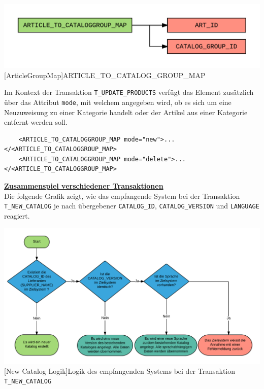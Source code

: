 	\begin{minipage}{\linewidth}
		\vspace{1em}
		\centering
		\includegraphics[width=0.7\linewidth]{img/articleGroupMap}
		[ArticleGroupMap]{ARTICLE\_TO\_CATALOG\_GROUP\_MAP}
		\label{fig:header}
		\vspace{1em}
	\end{minipage}
	
	Im Kontext der Transaktion \texttt{T\_UPDATE\_PRODUCTS} verfügt das Element zusätzlich über das Attribut \texttt{mode}, mit welchem angegeben wird, ob es sich um eine Neuzuweisung zu einer Kategorie handelt oder der Artikel aus einer Kategorie entfernt werden soll.
	
	\begin{lstlisting}
	<ARTICLE_TO_CATALOGGROUP_MAP mode="new">...</<ARTICLE_TO_CATALOGGROUP_MAP>
	<ARTICLE_TO_CATALOGGROUP_MAP mode="delete">...</<ARTICLE_TO_CATALOGGROUP_MAP>
	\end{lstlisting}
	
	
	\textbf{\underline{Zusammenspiel verschiedener Transaktionen}}\\
	
	Die folgende Grafik zeigt, wie das empfangende System bei der Transaktion \texttt{T\_NEW\_CATALOG} je nach übergebener \texttt{CATALOG\_ID}, \texttt{CATALOG\_VERSION} und \texttt{LANGUAGE} reagiert.
	
	\begin{minipage}{\linewidth}
		\vspace{1em}
		\centering
		\includegraphics[width=0.8\linewidth]{img/newCatalogLogik}
		[New Catalog Logik]{Logik des empfangenden Systems bei der Transaktion  \texttt{T\_NEW\_CATALOG}}
		\label{fig:header}
		\vspace{1em}
	\end{minipage}
	
